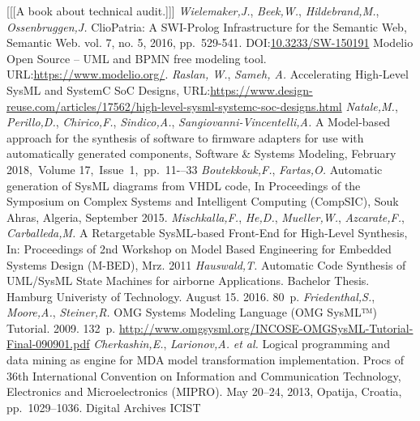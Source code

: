 \documentclass[conference]{IEEEtran}
\begin{document}
\begin{thebibliography}{99}
 [[[A book about technical audit.]]]
 \emph{Wielemaker,J.}, \emph{Beek,W.}, \emph{Hildebrand,M.}, \emph{Ossenbruggen,J.} ClioPatria: A SWI-Prolog Infrastructure for the Semantic Web, Semantic Web. vol. 7, no. 5, 2016, pp.~529-541. DOI:\url{10.3233/SW-150191}
 Modelio Open Source -- UML and BPMN free modeling tool. URL:\url{https://www.modelio.org/}.
 \emph{Raslan, W.}, \emph{Sameh, A.} Accelerating High-Level SysML and SystemC SoC Designs, URL:\url{https://www.design-reuse.com/articles/17562/high-level-sysml-systemc-soc-designs.html}
 \emph{Natale,M.}, \emph{Perillo,D.}, \emph{Chirico,F.}, \emph{Sindico,A.}, \emph{Sangiovanni-Vincentelli,A.} A Model-based approach for the synthesis of software to firmware adapters for use with automatically generated components, Software \& Systems Modeling, February 2018,~Volume 17,~Issue~1,~pp.~11-–33
 \emph{Boutekkouk,F.}, \emph{Fartas,O.} Automatic generation of SysML diagrams from VHDL code, In Proceedings of the Symposium on Complex Systems and Intelligent Computing (CompSIC), Souk Ahras, Algeria, September 2015.
 \emph{Mischkalla,F.}, \emph{He,D.}, \emph{Mueller,W.}, \emph{Azcarate,F.}, \emph{Carballeda,M.} A Retargetable SysML-based Front-End for High-Level Synthesis, In: Proceedings of 2nd Workshop on Model Based Engineering for Embedded Systems Design (M-BED), Mrz. 2011
 \emph{Hauswald,T.} Automatic Code Synthesis of UML/SysML State Machines for airborne Applications.  Bachelor Thesis. Hamburg Univeristy of Technology. August 15. 2016. 80~p.
 \emph{Friedenthal,S.}, \emph{Moore,A.}, \emph{Steiner,R.} OMG Systems Modeling Language (OMG SysML™) Tutorial. 2009. 132~p. \url{http://www.omgsysml.org/INCOSE-OMGSysML-Tutorial-Final-090901.pdf}
 \emph{Cherkashin,E.}, \emph{Larionov,A.} \emph{et al.} Logical programming and data mining as engine for MDA model transformation implementation. Procs of 36th International Convention on Information and Communication Technology, Electronics and Microelectronics (MIPRO). May 20--24, 2013, Opatija, Croatia, pp.~1029--1036.
 Digital Archives
 ICIST
\end{thebibliography}
\end{document}
